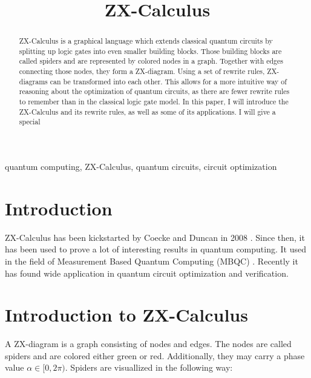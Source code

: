 \documentclass[conference]{IEEEtran}
\begin{document}
\title{ZX-Calculus}

\author{
}

\maketitle

\begin{abstract}
    ZX-Calculus is a graphical language which extends classical quantum circuits by splitting up logic gates into even smaller building blocks. Those building blocks are called spiders and are represented by colored nodes in a graph. Together with edges connecting those nodes, they form a ZX-diagram. Using a set of rewrite rules, ZX-diagrams can be transformed into each other. This allows for a more intuitive way of reasoning about the optimization of quantum circuits, as there are fewer rewrite rules to remember than in the classical logic gate model. In this paper, I will introduce the ZX-Calculus and its rewrite rules, as well as some of its applications. I will give a special
\end{abstract}

\begin{IEEEkeywords}
    quantum computing, ZX-Calculus, quantum circuits, circuit optimization
\end{IEEEkeywords}

\section{Introduction}

ZX-Calculus has been kickstarted by Coecke and Duncan in 2008 \cite{Coecke2007graphicalcalculus}. Since then, it has been used to prove a lot of interesting results in quantum computing. It used in the field of Measurement Based Quantum Computing (MBQC) \cite{duncan2012graphical}. Recently \cite{vandewetering2020zxcalculus} it has found wide application in quantum circuit optimization and verification.

\section{Introduction to ZX-Calculus}

A ZX-diagram is a graph consisting of nodes and edges. The nodes are called spiders and are colored either green or red. Additionally, they may carry a phase value $\alpha \in [0, 2\pi)$. Spiders are visuallized in the following way:
\end{document}

